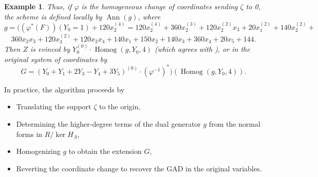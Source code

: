 \documentclass[a4paper,11p]{amsart}
\newtheorem{example0}[defn0]{Example}
\newenvironment{example}{ \begin{example0}\rm}{\end{example0}}
\begin{document}
\begin{example}
    Thus, if $\varphi$ is the homogeneous change of coordinates sending $\zeta$ to 0, the scheme is defined locally by $\operatorname{Ann}(g)$, where 
    \[g=((\varphi^*(F))(Y_0=1)+ 120 x_2^{(4)}=
    120x_2^{(4)} + 360x_2^{(3)} + 120x_2^{(2)}x_3 + 20x_1^{(2)} + 140x_2^{(2)} + \]\[ 360x_2x_3 + 120x_3^{(2)} + 120x_2x_4 + 140x_1 + 150x_2 + 140x_3 + 360x_4 + 20x_5 + 144.
\]
    Then 
    $Z$ is evinced by $Y_0^{(0)}\cdot \operatorname{Homog}(g, Y_0, 4)$ (which agrees with \cite[Example 4.6]{GAD}), or in the original system of coordinates by 
    \[G=(Y_0+Y_1+2Y_3-Y_4 + 3Y_5)^{(0)}\cdot (\varphi^{-1})^*)(\operatorname{Homog}(g, Y_0, 4)).\]
\end{example}
In practice, the algorithm proceeds by
\begin{itemize}
    \item Translating the support $\zeta$ to the origin,
    \item Determining the higher-degree terms of the dual generator $g$ from the normal forms in $R/\ker H_\Lambda$,
    \item  Homogenizing $g$ to obtain the extension $G$, 
    \item Reverting the coordinate change to recover the GAD in the original variables.
\end{itemize}
\end{document}
